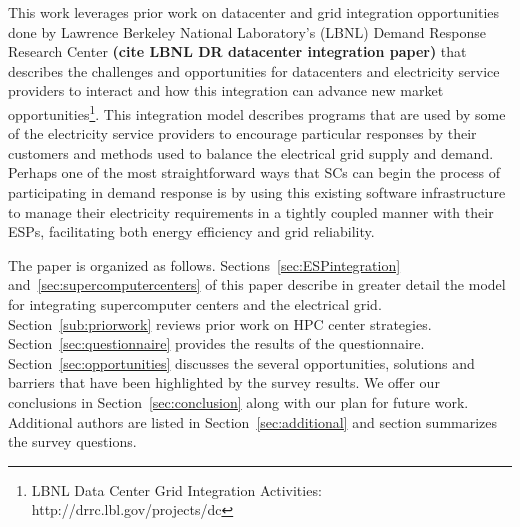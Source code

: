 This work leverages prior work on datacenter and grid integration opportunities
done by Lawrence Berkeley National Laboratory's (LBNL) Demand Response 
Research Center \textbf{(cite LBNL DR datacenter integration paper)}
that describes the challenges and opportunities for datacenters and electricity
service providers to interact and how this integration can advance 
new market 
opportunities\footnote{LBNL Data Center Grid Integration Activities: http://drrc.lbl.gov/projects/dc}.
This integration model describes programs that are used by some of the electricity 
service providers to encourage particular responses by their customers and methods 
used to balance the electrical grid supply and demand.
Perhaps one of the most straightforward ways that SCs can begin
the process of participating in demand response is by using this existing software 
infrastructure to manage their electricity requirements in a tightly coupled manner 
with their ESPs, facilitating both energy efficiency and grid reliability.

The paper is organized as follows.
Sections~\ref{sec:ESPintegration} and~\ref{sec:supercomputercenters} of this paper
describe in greater detail the model for 
integrating supercomputer centers and the electrical grid.
Section~\ref{sub:priorwork}
reviews prior work on HPC center strategies. Section~\ref{sec:questionnaire}
provides the results of the questionnaire. 
Section~\ref{sec:opportunities} 
discusses the several opportunities, solutions and barriers that have been highlighted
by the survey results. We offer our conclusions in Section~\ref{sec:conclusion} along with our plan for future work.  Additional authors are listed in Section~\ref{sec:additional} and
section  summarizes the survey questions.
